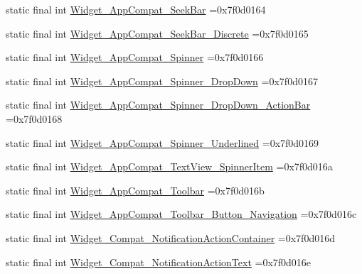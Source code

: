 \begin{DoxyCompactItemize}
\item 
static final int \mbox{\hyperlink{classcom_1_1example_1_1trainawearapplication_1_1_r_1_1style_aa5ac29d1a993fd6ecbbdd6c57996d156}{Widget\+\_\+\+App\+Compat\+\_\+\+Seek\+Bar}} =0x7f0d0164
\item 
static final int \mbox{\hyperlink{classcom_1_1example_1_1trainawearapplication_1_1_r_1_1style_aa14ee3899bd28eab68d94b323bc0d2f3}{Widget\+\_\+\+App\+Compat\+\_\+\+Seek\+Bar\+\_\+\+Discrete}} =0x7f0d0165
\item 
static final int \mbox{\hyperlink{classcom_1_1example_1_1trainawearapplication_1_1_r_1_1style_a5f0a67f386e612a8bb3e2c57ad4ff38e}{Widget\+\_\+\+App\+Compat\+\_\+\+Spinner}} =0x7f0d0166
\item 
static final int \mbox{\hyperlink{classcom_1_1example_1_1trainawearapplication_1_1_r_1_1style_a2bb10bb8e41e923ea8a8d5a8b31e8bd6}{Widget\+\_\+\+App\+Compat\+\_\+\+Spinner\+\_\+\+Drop\+Down}} =0x7f0d0167
\item 
static final int \mbox{\hyperlink{classcom_1_1example_1_1trainawearapplication_1_1_r_1_1style_a964abe8f03281c4e1fe4d310f0d59cbf}{Widget\+\_\+\+App\+Compat\+\_\+\+Spinner\+\_\+\+Drop\+Down\+\_\+\+Action\+Bar}} =0x7f0d0168
\item 
static final int \mbox{\hyperlink{classcom_1_1example_1_1trainawearapplication_1_1_r_1_1style_af940f72158131938abfe3e5439e111e8}{Widget\+\_\+\+App\+Compat\+\_\+\+Spinner\+\_\+\+Underlined}} =0x7f0d0169
\item 
static final int \mbox{\hyperlink{classcom_1_1example_1_1trainawearapplication_1_1_r_1_1style_abb11bd1465cc1e14f6c732db31e8b85a}{Widget\+\_\+\+App\+Compat\+\_\+\+Text\+View\+\_\+\+Spinner\+Item}} =0x7f0d016a
\item 
static final int \mbox{\hyperlink{classcom_1_1example_1_1trainawearapplication_1_1_r_1_1style_aedfbfd0f4da1d4299cf253502e516cad}{Widget\+\_\+\+App\+Compat\+\_\+\+Toolbar}} =0x7f0d016b
\item 
static final int \mbox{\hyperlink{classcom_1_1example_1_1trainawearapplication_1_1_r_1_1style_a547ab600d320ed5e6f8ea6687c36ecc2}{Widget\+\_\+\+App\+Compat\+\_\+\+Toolbar\+\_\+\+Button\+\_\+\+Navigation}} =0x7f0d016c
\item 
static final int \mbox{\hyperlink{classcom_1_1example_1_1trainawearapplication_1_1_r_1_1style_a86e4be31feeed068e2667c006dc78a0b}{Widget\+\_\+\+Compat\+\_\+\+Notification\+Action\+Container}} =0x7f0d016d
\item 
static final int \mbox{\hyperlink{classcom_1_1example_1_1trainawearapplication_1_1_r_1_1style_ab2a3ae7a79e6e33986e8513bc232fce5}{Widget\+\_\+\+Compat\+\_\+\+Notification\+Action\+Text}} =0x7f0d016e

\end{DoxyCompactItemize}

